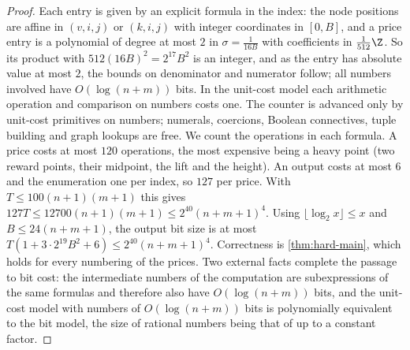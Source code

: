 \begin{proof}
Each entry is given by an explicit formula in the index: the node positions are affine in $(v,i,j)$ or $(k,i,j)$ with integer coordinates in $[0,B]$, and a price entry is a polynomial of degree at most $2$ in $\sigma=\frac1{16B}$ with coefficients in $\frac1{512}\Z$. So its product with $512(16B)^2=2^{17}B^2$ is an integer, and as the entry has absolute value at most $2$, the bounds on denominator and numerator follow; all numbers involved have $O(\log(n+m))$ bits. In the unit-cost model each arithmetic operation and comparison on numbers costs one. The counter is advanced only by unit-cost primitives on numbers; numerals, coercions, Boolean connectives, tuple building and graph lookups are free. We count the operations in each formula. A price costs at most $120$ operations, the most expensive being a heavy point (two reward points, their midpoint, the lift and the height). An output costs at most $6$ and the enumeration one per index, so $127$ per price. With $T\le100(n+1)(m+1)$ this gives $127T\le12700(n+1)(m+1)\le2^{40}(n+m+1)^4$. Using $\lfloor\log_2x\rfloor\le x$ and $B\le24(n+m+1)$, the output bit size is at most $T(1+3\cdot2^{19}B^2+6)\le2^{40}(n+m+1)^4$. Correctness is \cref{thm:hard-main}, which holds for every numbering of the prices. Two external facts complete the passage to bit cost: the intermediate numbers of the computation are subexpressions of the same formulas and therefore also have $O(\log(n+m))$ bits, and the unit-cost model with numbers of $O(\log(n+m))$ bits is polynomially equivalent to the bit model, the size of rational numbers being that of \citet[\S2.1]{Schrijver1986} up to a constant factor.
\end{proof}
